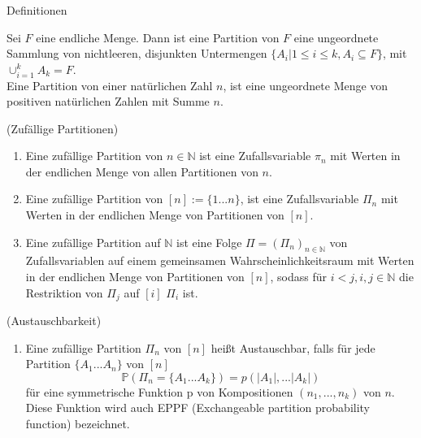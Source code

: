 \begin{section}{Definitionen}
\begin{Definition}
   Sei $F$ eine endliche Menge. Dann ist eine Partition von $F$ eine ungeordnete Sammlung von nichtleeren, disjunkten Untermengen $\{A_i| 1 \leq i \leq k, A_i \subseteq F\}$, mit $\cup_{i=1}^{k}A_k = F$.\\
   Eine Partition von einer natürlichen Zahl $n$, ist eine ungeordnete Menge von positiven natürlichen Zahlen mit Summe $n$.
\end{Definition}
\begin{Definition}
    \textnormal{(Zufällige Partitionen)}
\begin{enumerate}
    \item Eine zufällige Partition von $n\in \mathbb{N}$ ist eine Zufallsvariable $\pi_n$ mit Werten in der endlichen Menge von allen Partitionen von $n$.
    \item Eine zufällige Partition von $[n] := \{1 ...n\}$, ist eine Zufallsvariable $\Pi_n$ mit Werten in der endlichen Menge von Partitionen von $[n]$.
    \item Eine zufällige Partition auf $\mathbb{N}$ ist eine Folge $\Pi = (\Pi_n)_{n\in \mathbb{N}}$ von Zufallsvariablen auf einem gemeinsamen Wahrscheinlichkeitsraum mit Werten in der endlichen Menge von Partitionen von $[n]$, sodass für $i<j, i,j \in \mathbb{N}$ die Restriktion von $\Pi_j$ auf $[i]$ $\Pi_i$ ist.
\end{enumerate}

\end{Definition}
\begin{Definition}
    \textnormal{(Austauschbarkeit)}
    \begin{enumerate}
        \item Eine zufällige Partition $\Pi_n$ von $[n]$ heißt Austauschbar, falls für jede Partition $\{ A_1 ... A_n\}$ von $[n]$
        \[ 
            \mathbb{P}(\Pi_n = \{ A_1 ... A_k\}) = p(|A_1|, ... |A_k|)
        \]  
        für eine symmetrische Funktion p von Kompositionen $(n_1, ..., n_k)$ von $n$. Diese Funktion wird auch EPPF (Exchangeable partition probability function) bezeichnet.

    \end{enumerate}
\end{Definition}

\end{section}